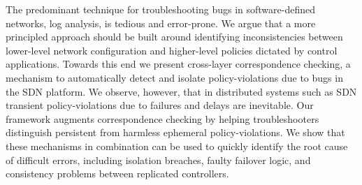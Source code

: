 The predominant technique for troubleshooting bugs in software-defined networks,
log analysis, is tedious and error-prone. We argue that a more principled
approach should be built around identifying inconsistencies between lower-level
network configuration and higher-level policies dictated by control
applications. Towards this end we present
cross-layer correspondence checking, a mechanism to automatically detect and
isolate policy-violations due to bugs in the SDN platform. We observe,
however, that in
distributed systems such as SDN 
transient policy-violations due to failures and delays are inevitable.
Our \simulator{} framework augments correspondence checking by helping troubleshooters
distinguish persistent from harmless ephemeral policy-violations.
We show that these mechanisms in combination can be used to quickly
identify the root cause of difficult errors, including isolation breaches,
faulty failover logic, and consistency problems between replicated
controllers.

